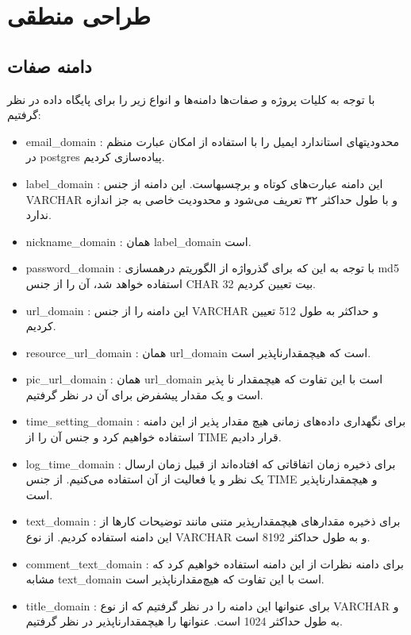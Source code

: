 \documentclass{article}
\begin{document}
\section*{طراحی منطقی}
\subsection*{دامنه صفات} \label{sect:domains}
با توجه به کلیات پروژه و صفات‌ها دامنه‌ها و انواع زیر را برای پایگاه داده در نظر گرفتیم:
\begin{itemize}
	\item
	email\_domain
	: محدودیتهای استاندارد ایمیل را با استفاده از امکان عبارت منظم در postgres پیاده‌سازی کردیم. 
	\item
	label\_domain
	: این دامنه عبارت‌های کوتاه و برچسبهاست. این دامنه از جنس VARCHAR و با طول حداکثر ۳۲ تعریف می‌شود و محدودیت خاصی به جز اندازه ندارد.
	\item
	nickname\_domain
	: همان label\_domain است. 
	\item
	password\_domain
	: با توجه به این که برای گذرواژه از الگوریتم درهمسازی md5 استفاده خواهد شد، آن را از جنس CHAR  32 بیت تعیین کردیم. 
	\item
	url\_domain
	: این دامنه را از جنس VARCHAR و حداکثر به طول 512 تعیین کردیم. 
	\item
	resource\_url\_domain
	: همان url\_domain است که هیچمقدارناپذیر است. 
	\item
	pic\_url\_domain
	: همان url\_domain است با این تفاوت که هیچمقدار نا پذیر است و یک مقدار پیشفرض  برای آن در نظر گرفتیم. 
	\item
	time\_setting\_domain
	: برای نگهداری داده‌های زمانی هیچ مقدار پذیر از این دامنه استفاده خواهیم کرد و جنس آن را از TIME قرار دادیم. 
	\item
	log\_time\_domain
	: برای ذخیره زمان اتفاقاتی که افتاده‌اند از قبیل زمان ارسال یک نظر و یا فعالیت از آن استفاده می‌کنیم. از جنس TIME و هیچمقدارناپذیر است. 
	\item
	text\_domain
	: برای ذخیره مقدارهای هیچمقدارپذیر متنی مانند توضیحات کارها از این دامنه استفاده کردیم. از نوع VARCHAR و به طول حداکثر 8192 است.
	\item
	comment\_text\_domain
	: برای دامنه نظرات از این دامنه استفاده خواهیم کرد که مشابه text\_domain است با این تفاوت که هیچ‌مقدارناپذیر است. 
	\item
	title\_domain
	: برای عنوانها این دامنه را در نظر گرفتیم که از نوع VARCHAR و به طول حداکثر 1024 است. عنوانها را هیچمقدارناپذیر در نظر گرفتیم. 

\end{itemize}
\end{document}
